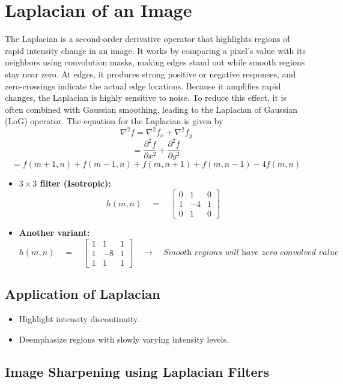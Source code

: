 \section{Laplacian of an Image}
The Laplacian is a second-order derivative operator that highlights regions of rapid intensity change in an image.
It works by comparing a pixel’s value with its neighbors using convolution masks, making edges stand out while smooth regions stay near zero.
At edges, it produces strong positive or negative responses, and zero-crossings indicate the actual edge locations.
Because it amplifies rapid changes, the Laplacian is highly sensitive to noise.
To reduce this effect, it is often combined with Gaussian smoothing, leading to the Laplacian of Gaussian (LoG) operator. The equation for the Laplacian is given by
\[\nabla^2 f = \nabla^2 f_x + \nabla^2 f_y\]
\[
= \frac{\partial^2 f}{\partial x^2} + \frac{\partial^2 f}{\partial y^2}
\]
\[
= f(m+1,n) + f(m-1,n) + f(m,n+1) + f(m,n-1) - 4f(m,n)
\]
\begin{itemize}
    \item \textbf{$3 \times 3$ filter (Isotropic):}
\[
h(m,n) \quad=\quad 
\begin{bmatrix}
0 & 1 & 0 \\
1 & -4 & 1 \\
0 & 1 & 0
\end{bmatrix}
\]
\item \textbf{Another variant:}
\[
h(m,n) \quad=\quad
\begin{bmatrix}
1 & 1 & 1 \\
1 & -8 & 1 \\
1 & 1 & 1
\end{bmatrix}
\quad\rightarrow\quad \textit{Smooth regions will have zero convolved value}
\]
\end{itemize}
\subsection*{Application of Laplacian}
\begin{itemize}
    \item Highlight intensity discontinuity.
    \item Deemphasize regions with slowly varying intensity levels. 
\end{itemize}
\subsection*{Image Sharpening using Laplacian Filters}
\vspace{2pt}

